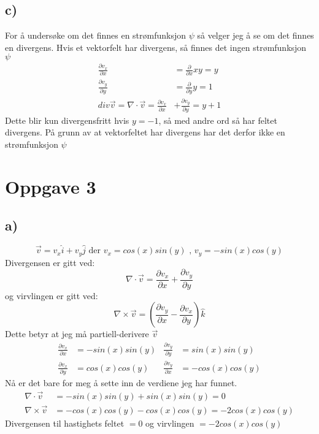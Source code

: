 \documentclass[a4paper,12pt,norsk]{article}
\begin{document}
\subsection{c)}
For å undersøke om det finnes en strømfunksjon $\psi$ så velger jeg å se om det finnes en divergens. Hvis et vektorfelt har divergens, så finnes det ingen strømfunksjon $\psi$
\begin{align*}
\frac{\partial{v_x}}{\partial{x}} &= \frac{\partial}{\partial{x}}xy = y \\
\frac{\partial{v_y}}{\partial{y}} &= \frac{\partial}{\partial{y}}y = 1\\
div\vec{v}=\nabla \cdot \vec{v} = \frac{\partial{v_x}}{\partial{x}}&+\frac{\partial{v_y}}{\partial{y}} = y + 1
\end{align*}
Dette blir kun divergensfritt hvis $y = -1$, så med andre ord så har feltet divergens. På grunn av at vektorfeltet har divergens har det derfor ikke en strømfunksjon $\psi$

\section{Oppgave 3}
\subsection{a)}
$$\vec{v} = v_x\hat{i} + v_y\hat{j} \textrm{ der }v_x = cos(x)sin(y) \textrm{ , } v_y = -sin(x)cos(y)$$
Divergensen er gitt ved:
$$\nabla \cdot \vec{v} = \frac{\partial{v_x}}{\partial{x}}+\frac{\partial{v_y}}{\partial{y}}$$
og virvlingen er gitt ved:
$$\nabla \times \vec{v} =  (\frac{\partial{v_y}}{\partial{x}}-\frac{\partial{v_x}}{\partial{y}})\hat{k}$$
Dette betyr at jeg må partiell-derivere $\vec{v}$ 
\begin{align*}
\frac{\partial{v_x}}{\partial{x}} &= -sin(x)sin(y) &\text{} \frac{\partial{v_y}}{\partial{y}} &= sin(x)sin(y) \\
\frac{\partial{v_x}}{\partial{y}} &= cos(x)cos(y) &\text{} \frac{\partial{v_y}}{\partial{x}} &= -cos(x)cos(y)
\end{align*}
Nå er det bare for meg å sette inn de verdiene jeg har funnet.
\begin{align*}
\nabla \cdot \vec{v} &= -sin(x)sin(y) + sin(x)sin(y) = 0\\
\nabla \times \vec{v} &= -cos(x)cos(y)- cos(x)cos(y) = -2cos(x)cos(y)
\end{align*}
Divergensen til hastighets feltet $= 0$ og virvlingen $=-2cos(x)cos(y)$
\end{document}
